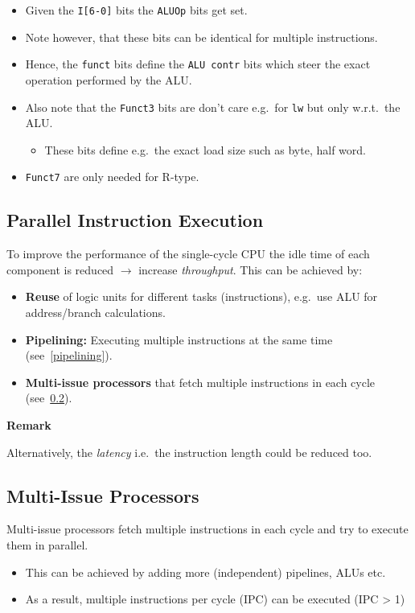\newpar{}
\begin{itemize}
    \item Given the \texttt{I[6-0]} bits the \texttt{ALUOp} bits get set.
    \item Note however, that these bits can be identical for multiple instructions.
    \item Hence, the \texttt{funct} bits define the \texttt{ALU contr} bits which steer the exact operation performed by the ALU.
    \item Also note that the \texttt{Funct3} bits are don't care e.g.\ for \texttt{lw} but only w.r.t.\ the ALU.
    \begin{itemize}
        \item These bits define e.g.\ the exact load size such as byte, half word.
    \end{itemize}
    \item \texttt{Funct7} are only needed for R-type.
\end{itemize}

\subsection{Parallel Instruction Execution}

To improve the performance of the single-cycle CPU the idle time of each component is reduced  $\to$ increase \textit{throughput}. This can be achieved by:

\begin{itemize}
    \item \textbf{Reuse} of logic units for different tasks (instructions), e.g.\ use ALU for address/branch calculations.
    \item \textbf{Pipelining:} Executing multiple instructions at the same time (see~\ref{pipelining}).
    \item \textbf{Multi-issue processors} that fetch multiple instructions in each cycle (see~\ref{multi-issue processors}).
\end{itemize}

\textbf{Remark}

Alternatively, the \textit{latency} i.e.\ the instruction length could be reduced too.

\subsection{Multi-Issue Processors}\label{multi-issue processors}
Multi-issue processors fetch multiple instructions in each cycle and try to execute them in parallel.
\begin{itemize}
    \item This can be achieved by adding more (independent) pipelines, ALUs etc.
    \item As a result, multiple instructions per cycle (IPC) can be executed (IPC > 1)
\end{itemize}
